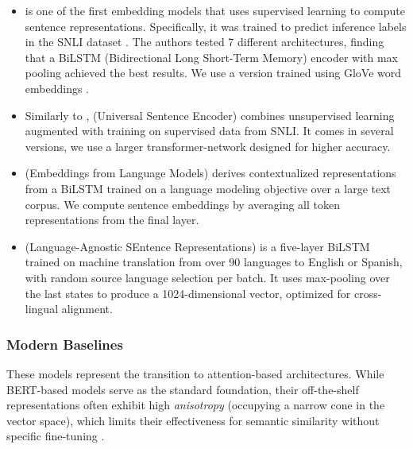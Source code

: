 \begin{itemize}
    \item \infersent{} \citep{infersent} is one of the first embedding models that uses supervised learning to compute sentence representations. Specifically, it was trained to predict inference labels in the SNLI dataset \citep{snli}. The authors tested 7 different architectures, finding that a BiLSTM (Bidirectional Long Short-Term Memory) encoder with max pooling achieved the best results. We use a version trained using GloVe word embeddings \citep{glove}. %
    \item Similarly to \infersent, \useemb (Universal Sentence Encoder) \citep{use} combines unsupervised learning augmented with training on supervised data from SNLI. It comes in several versions, we use a larger transformer-network designed for higher accuracy. %
    \item \elmo{} (Embeddings from Language Models) \citep{elmo} derives contextualized representations from a BiLSTM trained on a language modeling objective over a large text corpus.  We compute sentence embeddings by averaging all token representations from the final layer.
    \item \laser{} (Language-Agnostic SEntence Representations) \citep{laser} is a five-layer BiLSTM trained on machine translation from over 90 languages to English or Spanish, with random source language selection per batch. It uses max-pooling over the last states to produce a 1024-dimensional vector, optimized for cross-lingual alignment.    


\end{itemize}

\subsubsection{Modern Baselines}
These models represent the transition to attention-based architectures. While BERT-based models serve as the standard foundation, their off-the-shelf representations often exhibit high \textit{anisotropy} (occupying a narrow cone in the vector space), which limits their effectiveness for semantic similarity without specific fine-tuning \citep{ethayarajh-2019-contextual}.

